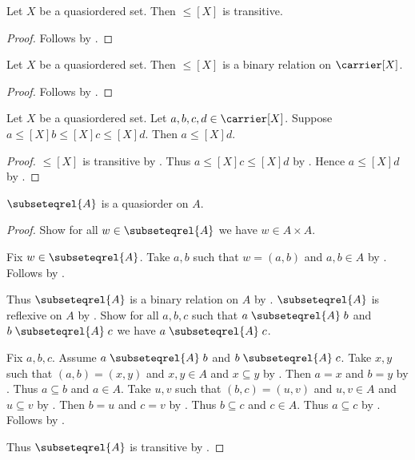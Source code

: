 \begin{classification}\label{quasiorder_relation_transitive}
    Let $X$ be a quasiordered set.
    Then $\leq[X]$ is transitive.
\end{classification}
\begin{proof}
    Follows by .
\end{proof}

\begin{proposition}\label{quasiorder_type}
    Let $X$ be a quasiordered set.
    Then $\leq[X]$ is a binary relation on $\carrier[X]$.
\end{proposition}
\begin{proof}
    Follows by .
\end{proof}

\begin{lemma}\label{quasiorder_transitive_double}
    Let $X$ be a quasiordered set.
    Let $a,b,c,d\in\carrier[X]$.
    Suppose $a\mathrel{\leq[X]}b\mathrel{\leq[X]}c
        \mathrel{\leq[X]}d$.
    Then $a\mathrel{\leq[X]} d$.
\end{lemma}
\begin{proof}
    $\leq[X]$ is transitive by .
    Thus $a\mathrel{\leq[X]} c\mathrel{\leq[X]} d$ by .
    Hence $a\mathrel{\leq[X]} d$ by .
\end{proof}

\begin{proposition}\label{subseteqrel_is_quasiorder}
    $\subseteqrel{A}$ is a quasiorder on $A$.
\end{proposition}
\begin{proof}
    Show for all $w\in\subseteqrel{A}$ we have $w\in A\times A$.
    \begin{subproof}
        Fix $w\in\subseteqrel{A}$.
        Take $a,b$ such that $w=(a,b)$ and $a,b\in A$
            by .
        Follows by .
    \end{subproof}
    Thus $\subseteqrel{A}$ is a binary relation on $A$
        by .
    $\subseteqrel{A}$ is reflexive on $A$
        by .
    Show for all $a,b,c$ such that
        $a\mathrel{\subseteqrel{A}}b$ and
        $b\mathrel{\subseteqrel{A}}c$
        we have $a\mathrel{\subseteqrel{A}}c$.
    \begin{subproof}
        Fix $a,b,c$.
        Assume $a\mathrel{\subseteqrel{A}}b$ and
            $b\mathrel{\subseteqrel{A}}c$.
        Take $x,y$ such that $(a,b)=(x,y)$ and
            $x,y\in A$ and $x\subseteq y$ by .
        Then $a=x$ and $b=y$ by .
        Thus $a\subseteq b$ and $a\in A$.
        Take $u,v$ such that $(b,c)=(u,v)$ and
            $u,v\in A$ and $u\subseteq v$ by .
        Then $b=u$ and $c=v$ by .
        Thus $b\subseteq c$ and $c\in A$.
        Thus $a\subseteq c$ by .
        Follows by .
    \end{subproof}
    Thus $\subseteqrel{A}$ is transitive
        by .
\end{proof}

